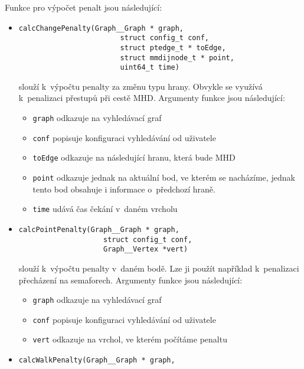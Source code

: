 Funkce pro výpočet penalt jsou následující:
\begin{itemize}
    \item \begin{verbatim}calcChangePenalty(Graph__Graph * graph, 
                        struct config_t conf,
                        struct ptedge_t * toEdge, 
                        struct mmdijnode_t * point, 
                        uint64_t time) 
    \end{verbatim}
    \vspace*{-0.5cm}
	slouží k~výpočtu penalty za změnu typu hrany. Obvykle se využívá
k~penalizaci přestupů při cestě MHD.
	Argumenty funkce jsou následující:
	\begin{itemize}
		\item {\tt graph} odkazuje na vyhledávací graf
		\item {\tt conf} popisuje konfiguraci vyhledávání od uživatele
		\item {\tt toEdge} odkazuje na následující hranu, která bude MHD   
		\item {\tt point} odkazuje jednak na aktuální bod, ve kterém se
		nacházíme, jednak tento bod obsahuje i informace o~předchozí
		hraně.
		\item {\tt time} udává čas čekání v~daném vrcholu
	\end{itemize}
	\item \begin{verbatim}calcPointPenalty(Graph__Graph * graph,
                    struct config_t conf,
                    Graph__Vertex *vert)
    \end{verbatim}
    \vspace*{-0.5cm}
    slouží k~výpočtu penalty v~daném bodě. Lze ji
	použít například k~penalizaci přecházení na semaforech. Argumenty
	funkce jsou následující:
	\begin{itemize}
		\item {\tt graph} odkazuje na vyhledávací graf
		\item {\tt conf} popisuje konfiguraci vyhledávání od uživatele
		\item {\tt vert} odkazuje na vrchol, ve kterém počítáme penaltu
	\end{itemize}
	\item \begin{verbatim}calcWalkPenalty(Graph__Graph * graph,

\end{verbatim}
\end{itemize}
